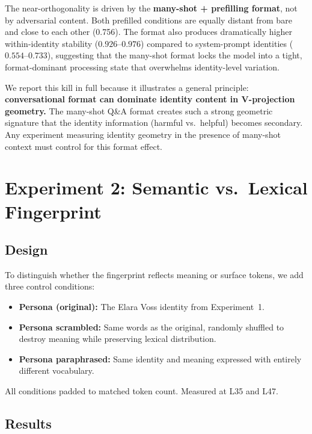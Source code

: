 \documentclass[11pt,a4paper]{article}
\begin{document}
The near-orthogonality is driven by the \textbf{many-shot + prefilling format},
not by adversarial content. Both prefilled conditions are equally distant
from bare and close to each other (0.756). The format also produces
dramatically higher within-identity stability ($0.926$--$0.976$) compared
to system-prompt identities ($0.554$--$0.733$), suggesting that the
many-shot format locks the model into a tight, format-dominant processing
state that overwhelms identity-level variation.

We report this kill in full because it illustrates a general principle:
\textbf{conversational format can dominate identity content in
V-projection geometry.} The many-shot Q\&A format creates such a strong
geometric signature that the identity information (harmful vs.\ helpful)
becomes secondary. Any experiment measuring identity geometry in the
presence of many-shot context must control for this format effect.

\section{Experiment 2: Semantic vs.\ Lexical Fingerprint}
\label{sec:lexical}

\subsection{Design}

To distinguish whether the fingerprint reflects meaning or surface tokens,
we add three control conditions:

\begin{itemize}[nosep]
  \item \textbf{Persona (original):} The Elara Voss identity from
    Experiment~1.
  \item \textbf{Persona scrambled:} Same words as the original, randomly
    shuffled to destroy meaning while preserving lexical distribution.
  \item \textbf{Persona paraphrased:} Same identity and meaning expressed
    with entirely different vocabulary.
\end{itemize}

All conditions padded to matched token count. Measured at L35 and L47.

\subsection{Results}
\end{document}
